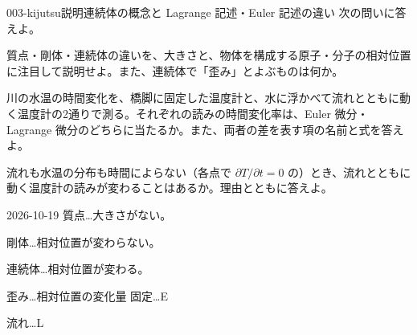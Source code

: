 \documentclass[uplatex,dvipdfmx,a4paper,11pt]{jsarticle}
\begin{document}
\begin{mondai}{003-kijutsu}{説明}{連続体の概念と Lagrange 記述・Euler 記述の違い}
次の問いに答えよ。
  \begin{shoumon}
    \item 質点・剛体・連続体の違いを、大きさと、物体を構成する原子・分子の相対位置に注目して説明せよ。また、連続体で「歪み」とよぶものは何か。
    \item 川の水温の時間変化を、橋脚に固定した温度計と、水に浮かべて流れとともに動く温度計の2通りで測る。それぞれの読みの時間変化率は、Euler 微分・Lagrange 微分のどちらに当たるか。また、両者の差を表す項の名前と式を答えよ。
    \item 流れも水温の分布も時間によらない（各点で $\partial T/\partial t = 0$ の）とき、流れとともに動く温度計の読みが変わることはあるか。理由とともに答えよ。
  \end{shoumon}
\begin{kotaeutsushi}{2026-10-19}
質点…大きさがない。

剛体…相対位置が変わらない。

連続体…相対位置が変わる。

歪み…相対位置の変化量
固定…E

流れ…L


\end{kotaeutsushi}
\end{mondai}
\end{document}
